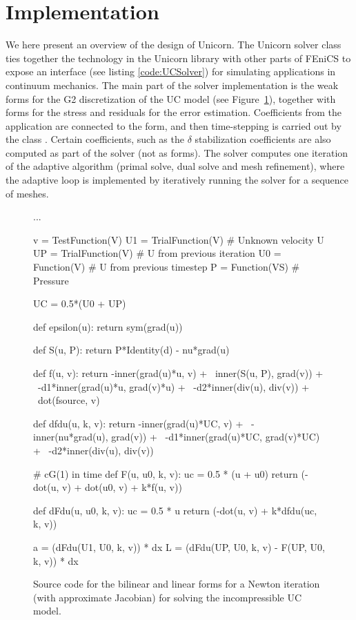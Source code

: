 \section{Implementation}

We here present an overview of the design of Unicorn. The Unicorn
solver class  ties together the technology in the
Unicorn library with other parts of FEniCS to expose an interface (see
listing \ref{code:UCSolver}) for simulating applications in continuum
mechanics. The main part of the solver implementation is the weak
forms for the G2 discretization of the UC model (see
Figure~\ref{code:FFC_UC}), together with forms for the stress and
residuals for the error estimation. Coefficients from the application
are connected to the form, and then time-stepping is carried out by
the class . Certain coefficients, such as the
$\delta$ stabilization coefficients are also computed as part of the
solver (not as forms). The solver computes one iteration of the
adaptive algorithm (primal solve, dual solve and mesh refinement),
where the adaptive loop is implemented by iteratively running the
solver for a sequence of meshes.

\begin{figure}
\begin{uflcode}
...

v = TestFunction(V)
U1 = TrialFunction(V) # Unknown velocity U
UP = TrialFunction(V) # U from previous iteration
U0 = Function(V)      # U from previous timestep
P = Function(VS)      # Pressure

UC = 0.5*(U0 + UP)

def epsilon(u):
    return sym(grad(u))

def S(u, P):
    return P*Identity(d) - nu*grad(u)

def f(u, v):
    return -inner(grad(u)*u, v) + \
        inner(S(u, P), grad(v)) + \
        -d1*inner(grad(u)*u, grad(v)*u) + \
        -d2*inner(div(u), div(v)) + \
        dot(fsource, v)

def dfdu(u, k, v):
    return -inner(grad(u)*UC, v) + \
        -inner(nu*grad(u), grad(v)) + \
        -d1*inner(grad(u)*UC, grad(v)*UC) + \
        -d2*inner(div(u), div(v))

# cG(1) in time
def F(u, u0, k, v):
    uc = 0.5 * (u + u0)
    return (-dot(u, v) + dot(u0, v) + k*f(u, v))

def dFdu(u, u0, k, v):
    uc = 0.5 * u
    return (-dot(u, v) + k*dfdu(uc, k, v))

a = (dFdu(U1, U0, k, v)) * dx
L = (dFdu(UP, U0, k, v) - F(UP, U0, k, v)) * dx
\end{uflcode}
\caption{Source code for the bilinear and linear forms for a Newton
  iteration (with approximate Jacobian) for solving the incompressible
  UC model.}
\label{code:FFC_UC}
\end{figure}


